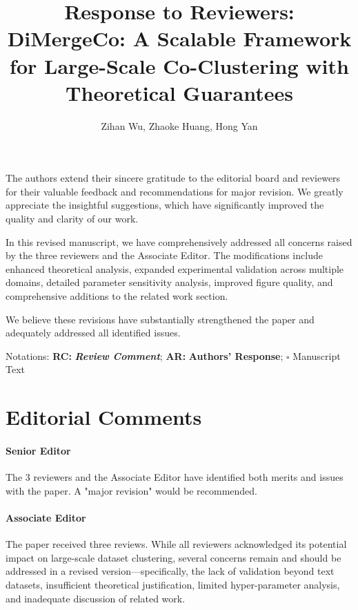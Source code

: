 \documentclass{ar2rc}
\title{Response to Reviewers:\\
DiMergeCo: A Scalable Framework for Large-Scale Co-Clustering with Theoretical Guarantees}
\author{Zihan Wu, Zhaoke Huang, Hong Yan}
\theoremstyle{definition}
\theoremstyle{remark} %
\begin{document}
\maketitle

\noindent
The authors extend their sincere gratitude to the editorial board and reviewers for their valuable feedback and recommendations for major revision. We greatly appreciate the insightful suggestions, which have significantly improved the quality and clarity of our work.

In this revised manuscript, we have comprehensively addressed all concerns raised by the three reviewers and the Associate Editor. The modifications include enhanced theoretical analysis, expanded experimental validation across multiple domains, detailed parameter sensitivity analysis, improved figure quality, and comprehensive additions to the related work section.

We believe these revisions have substantially strengthened the paper and adequately addressed all identified issues.

Notations: \textbf{RC:} \textbf{\textit{Review Comment}}; \textbf{AR:} \textbf{Authors' Response}; $\square$ Manuscript Text


\section{Editorial Comments}

\paragraph{Senior Editor} The 3 reviewers and the Associate Editor have identified both merits and issues with the paper. A "major revision" would be recommended.

\paragraph{Associate Editor} The paper received three reviews. While all reviewers acknowledged its potential impact on large-scale dataset clustering, several concerns remain and should be addressed in a revised version—specifically, the lack of validation beyond text datasets, insufficient theoretical justification, limited hyper-parameter analysis, and inadequate discussion of related work.
\end{document}
